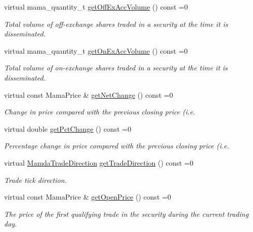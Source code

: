\begin{CompactItemize}
virtual mama\_\-quantity\_\-t \hyperlink{classWombat_1_1MamdaTradeRecap_5df4b8f6c1238676d1c50fb8d50ed2df}{get\-Off\-Ex\-Acc\-Volume} () const =0
\begin{CompactList}\small\item\em Total volume of off-exchange shares traded in a security at the time it is disseminated. \item\end{CompactList}\item 
virtual mama\_\-quantity\_\-t \hyperlink{classWombat_1_1MamdaTradeRecap_a876a7f85a983eec3a529d125721615b}{get\-On\-Ex\-Acc\-Volume} () const =0
\begin{CompactList}\small\item\em Total volume of on-exchange shares traded in a security at the time it is disseminated. \item\end{CompactList}\item 
virtual const Mama\-Price \& \hyperlink{classWombat_1_1MamdaTradeRecap_6f0e8f7dd9edd3f29e29c1d983d6b7ff}{get\-Net\-Change} () const =0
\begin{CompactList}\small\item\em Change in price compared with the previous closing price (i.e. \item\end{CompactList}\item 
virtual double \hyperlink{classWombat_1_1MamdaTradeRecap_05f9cfbfd50d3783a2d5716064ed7b9f}{get\-Pct\-Change} () const =0
\begin{CompactList}\small\item\em Percentage change in price compared with the previous closing price (i.e. \item\end{CompactList}\item 
virtual \hyperlink{namespaceWombat_d2479765bb418204c8ccfd3785d2bdbe}{Mamda\-Trade\-Direction} \hyperlink{classWombat_1_1MamdaTradeRecap_abbd87f4ea29275d32a78e20426cafca}{get\-Trade\-Direction} () const =0
\begin{CompactList}\small\item\em Trade tick direction. \item\end{CompactList}\item 
virtual const Mama\-Price \& \hyperlink{classWombat_1_1MamdaTradeRecap_cb3b351b6f32e8e1ec3c7a33864b8726}{get\-Open\-Price} () const =0
\begin{CompactList}\small\item\em The price of the first qualifying trade in the security during the current trading day. \item\end{CompactList}\item 

\end{CompactItemize}
